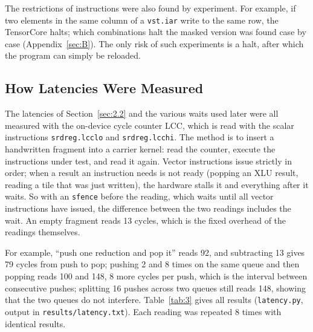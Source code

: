 \documentclass[sigconf,nonacm,balance=false]{acmart}
\newcommand{\code}[1]{\texttt{#1}}
\begin{document}
The restrictions of instructions were also found by experiment. For example, if two elements in the same column of a \code{vst.\allowbreak{}iar} write to the same row, the TensorCore halts; which combinations halt the masked version was found case by case (Appendix~\ref{sec:B}). The only risk of such experiments is a halt, after which the program can simply be reloaded.

\subsection{How Latencies Were Measured}
\label{sec:3.3}

The latencies of Section~\ref{sec:2.2} and the various waits used later were all measured with the on-device cycle counter LCC, which is read with the scalar instructions \code{srdreg.\allowbreak{}lcclo} and \code{srdreg.\allowbreak{}lcchi}. The method is to insert a handwritten fragment into a carrier kernel: read the counter, execute the instructions under test, and read it again. Vector instructions issue strictly in order; when a result an instruction needs is not ready (popping an XLU result, reading a tile that was just written), the hardware stalls it and everything after it waits. So with an \code{sfence} before the reading, which waits until all vector instructions have issued, the difference between the two readings includes the wait. An empty fragment reads 13 cycles, which is the fixed overhead of the readings themselves.

For example, ``push one reduction and pop it'' reads 92, and subtracting 13 gives 79 cycles from push to pop; pushing 2 and 8 times on the same queue and then popping reads 100 and 148, 8 more cycles per push, which is the interval between consecutive pushes; splitting 16 pushes across two queues still reads 148, showing that the two queues do not interfere. Table~\ref{tab:3} gives all results (\code{latency.\allowbreak{}py}, output in \code{results/\allowbreak{}latency.\allowbreak{}txt}). Each reading was repeated 8 times with identical results.
\end{document}
